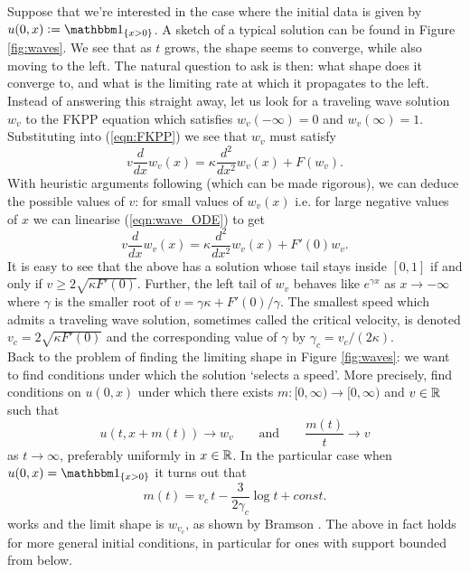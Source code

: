Suppose that we're interested in the case where the initial data is given by $u(0, x) \defeq \Ind_{\{ x > 0\}}$. A sketch of a typical solution can be found in Figure \ref{fig:waves}. We see that as $t$ grows, the shape seems to converge, while also moving to the left. The natural question to ask is then: what shape does it converge to, and what is the limiting rate at which it propagates to the left. Instead of answering this straight away, let us look for a traveling wave solution $w_v$ to the FKPP equation which satisfies $w_v(-\infty) = 0$ and $w_v(\infty) = 1$. Substituting into (\ref{eqn:FKPP}) we see that $w_v$ must satisfy
\begin{equation}\label{eqn:wave_ODE}
v \frac{d}{dx}w_v(x) = \kappa \frac{d^2}{dx^2} w_v (x) + F(w_v). 
\end{equation}
With heuristic arguments following \cite{brunet2015exactly} (which can be made rigorous), we can deduce the possible values of $v$: for small values of $w_v(x)$ i.e. for large negative values of $x$ we can linearise (\ref{eqn:wave_ODE}) to get
\begin{equation}\nonumber
v \frac{d}{dx}w_v(x) = \kappa \frac{d^2}{dx^2}w_v(x) + F'(0) w_v. 
\end{equation}
It is easy to see that the above has a solution whose tail stays inside $[0,1]$ if and only if $v \geq 2 \sqrt{\kappa F'(0)}$. Further, the left tail of $w_v$ behaves like $e^{\gamma x}$ as $x \to -\infty$ where $\gamma$ is the smaller root of $v = \gamma \kappa + F'(0) / \gamma$. The smallest speed which admits a traveling wave solution, sometimes called the critical velocity, is denoted $v_c = 2 \sqrt{\kappa F'(0)}$ and the corresponding value of $\gamma$ by $\gamma_c = v_c / (2 \kappa)$. \\

Back to the problem of finding the limiting shape in Figure \ref{fig:waves}: we want to find conditions under which the solution `selects a speed'. More precisely, find conditions on $u(0, x)$ under which there exists $m : [0, \infty) \to [0, \infty)$ and $v \in \mathbb{R}$ such that
\begin{equation}\nonumber
u(t, x + m(t)) \to w_v \qquad\text{and}\qquad \frac{m(t)}{t} \to v
\end{equation} 
as $t \to \infty$, preferably uniformly in $x \in \mathbb{R}$. In the particular case when $u(0, x) = \Ind_{\{ x > 0\}}$ it turns out that 
\begin{equation}\nonumber
m(t) = v_c\,t - \frac{3}{2 \gamma_c} \log t + const. 
\end{equation}
works and the limit shape is $w_{v_c}$, as shown by Bramson \cite{bramson1978maximal}. The above in fact holds for more general initial conditions, in particular for ones with support bounded from below. \\

